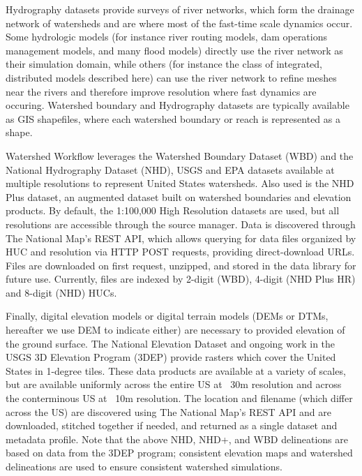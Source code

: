 \documentclass[a4paper,fleqn]{cas-dc}
\begin{document}
Hydrography datasets provide surveys of river networks, which form the drainage network of watersheds and are where most of the fast-time scale dynamics occur.
Some hydrologic models (for instance river routing models, dam operations management models, and many flood models) directly use the river network as their simulation domain, while others (for instance the class of integrated, distributed models described here) can use the river network to refine meshes near the rivers and therefore improve resolution where fast dynamics are occuring.
Watershed boundary and Hydrography datasets are typically available as GIS shapefiles, where each watershed boundary or reach is represented as a shape.

Watershed Workflow leverages the Watershed Boundary Dataset (WBD) and the National Hydrography Dataset (NHD), USGS and EPA datasets available at multiple resolutions to represent United States watersheds.\cite{NHD}
Also used is the NHD Plus dataset, an augmented dataset built on watershed boundaries and elevation products.
By default, the 1:100,000 High Resolution datasets are used, but all resolutions are accessible through the source manager.
Data is discovered through The National Map's REST API, which allows querying for data files organized by HUC and resolution via HTTP POST requests, providing direct-download URLs.
Files are downloaded on first request, unzipped, and stored in the data library for future use.
Currently, files are indexed by 2-digit (WBD), 4-digit (NHD Plus HR) and 8-digit (NHD) HUCs.


Finally, digital elevation models or digital terrain models (DEMs or DTMs, hereafter we use DEM to indicate either) are necessary to provided elevation of the ground surface.
The National Elevation Dataset and ongoing work in the USGS 3D Elevation Program (3DEP) provide rasters which cover the United States in 1-degree tiles.\cite{NED}
These data products are available at a variety of scales, but are available uniformly across the entire US at ~30m resolution and across the conterminous US at ~10m resolution.
The location and filename (which differ across the US) are discovered using The National Map's REST API and are downloaded, stitched together if needed, and returned as a single dataset and metadata profile.
Note that the above NHD, NHD+, and WBD delineations are based on data from the 3DEP program; consistent elevation maps and watershed delineations are used to ensure consistent watershed simulations.
\end{document}
